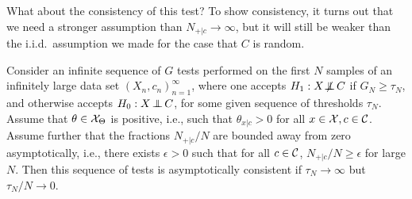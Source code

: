 What about the consistency of this test? To show consistency, it turns out that we need a stronger assumption
than $N_{+|c} \to \infty$, but it will still be weaker than the i.i.d.\ assumption we made for the case that $C$ is random.
\begin{Cor}\label{cor:ext_G_test_consistency}
Consider an infinite sequence of $G$ tests performed on the first $N$ samples of an infinitely large
data set $(X_n,c_n)_{n=1}^\infty$,
where one accepts $H_1 : X \operatorname*{\not\mkern-2mu\perp\mkern-11mu\perp} C$ if $G_N \ge \tau_N$, and otherwise accepts $H_0 : X \operatorname*{\perp\mkern-11mu\perp} C$, 
for some given sequence of thresholds $\tau_N$.
Assume that $\theta \in \mathcal{X}_\Theta$ is positive, i.e., such that $\theta_{x|c} > 0$ for all $x \in \mathcal{X}, c \in \mathcal{C}$.
Assume further that the fractions $N_{+|c} / N$ are bounded away from zero asymptotically,
i.e., there exists $\epsilon > 0$ such that for all $c \in \mathcal{C}$, $N_{+|c} / N \ge \epsilon$ for large $N$.
Then this sequence of tests is asymptotically consistent if $\tau_N \to \infty$ but $\tau_N / N \to 0$.
\end{Cor}
